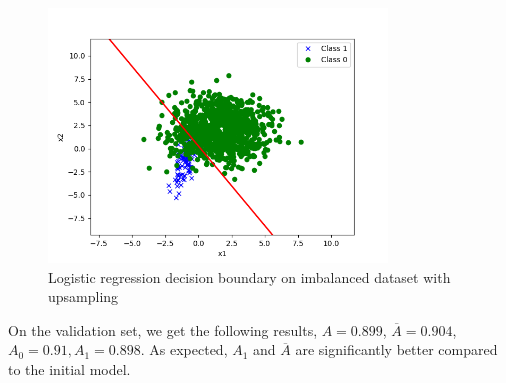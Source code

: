 
\begin{answer}
\begin{figure}[H]
    \centering
    \includegraphics[width=9cm]{imbalanced/upsampling.png}
    \caption*{Logistic regression decision boundary on imbalanced dataset with upsampling}
\end{figure}
On the validation set, we get the following results, $A = 0.899$, $\overline{A} = 0.904$, $A_0 = 0.91, A_1 = 0.898$. As expected, $A_1$ and $\overline{A}$ are significantly better compared to the initial model.
\end{answer}